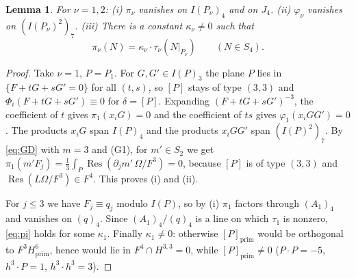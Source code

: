 \documentclass[10pt]{article}
\numberwithin{equation}{section}
\newtheorem{lemma}[theorem]{Lemma}
\theoremstyle{remark}
\newcommand{\Res}{\operatorname{Res}}
\begin{document}
\begin{lemma}\label{lem:pi}
For $\nu=1,2$: \textup{(i)} $\pi_\nu$ vanishes on $I(P_\nu)_4$ and on $J_4$. \textup{(ii)} $\varphi_\nu$
vanishes on $(I(P_\nu)^2)_7$. \textup{(iii)} There is a constant $\kappa_\nu\neq0$ such that
\begin{equation}\label{eq:pi}
\pi_\nu(N)=\kappa_\nu\cdot\tau_\nu(N|_{P_\nu})\qquad(N\in S_4).
\end{equation}
\end{lemma}
\begin{proof}
Take $\nu=1$, $P=P_1$. For $G,G'\in I(P)_3$ the plane $P$ lies in $\{F+tG+sG'=0\}$ for all $(t,s)$, so $[P]$
stays of type $(3,3)$ and $\Phi_i(F+tG+sG')\equiv0$ for $\delta=[P]$. Expanding $(F+tG+sG')^{-3}$, the
coefficient of $t$ gives $\pi_1(x_iG)=0$ and the coefficient of $ts$ gives $\varphi_1(x_iGG')=0$. The products
$x_iG$ span $I(P)_4$ and the products $x_iGG'$ span $(I(P)^2)_7$. By \eqref{eq:GD} with $m=3$ and (G1), for
$m'\in S_2$ we get $\pi_1(m'F_j)=\frac13\int_P\Res(\partial_jm'\,\Omega/F^3)=0$, because $[P]$ is of type $(3,3)$
and $\Res(L\Omega/F^3)\in F^4$. This proves (i) and (ii).

For $j\le 3$ we have $F_j\equiv q_j$ modulo $I(P)$, so by (i) $\pi_1$ factors through $(A_1)_4$ and vanishes on
$(q)_4$. Since $(A_1)_4/(q)_4$ is a line on which $\tau_1$ is nonzero, \eqref{eq:pi} holds for some $\kappa_1$.
Finally $\kappa_1\neq0$: otherwise $[P]_{\mathrm{prim}}$ would be orthogonal to $F^3H^6_{\mathrm{prim}}$, hence
would lie in $F^4\cap H^{3,3}=0$, while $[P]_{\mathrm{prim}}\neq0$ ($P\cdot P=-5$, $h^3\cdot P=1$,
$h^3\cdot h^3=3$).
\end{proof}
\end{document}

